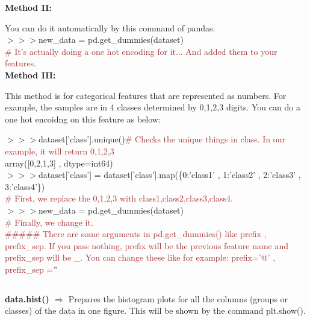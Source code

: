 \documentclass[a4paper,18pt]{article}
\begin{document}
\textbf{Method II:\\}

You can do it automatically by this command of pandas:\\

$>>>$new\_data = pd.get\_dummies(dataset)\\

{\textcolor{brown}{\# It's actually doing a one hot encoding for it... And added them to your features.}}\\

\textbf{Method III:\\}

This method is for categorical features that are represented as numbers. For example, the samples are in 4 classes determined by 0,1,2,3 digits. You can do a one hot encoidng on this feature as below:

$>>>$dataset['class'].unique(){\textcolor{brown}{\# Checks the unique things in class. In our example, it will return 0,1,2,3}}\\

\hspace*{14pt}array([0,2,1,3] , dtype=int64)\\

$>>>$dataset['class'] = dataset['class'].map(\{0:'class1' , 1:'class2' , 2:'class3' , 3:'class4'\})\\

{\textcolor{brown}{\# First, we replace the 0,1,2,3 with class1,class2,class3,class4.}}\\

$>>>$new\_data = pd.get\_dummies(dataset)\\

{\textcolor{brown}{\# Finally, we change it.}}\\


{\textcolor{brown}{\#\#\#\#\# There are some arguments in pd.get\_dummies() like prefix , prefix\_sep. If you pass nothing, prefix will be the previous feature name and prefix\_sep will be \_. You can change these like for example: prefix='@' , prefix\_sep ='\^' }}\\


\subsection{\colorbox {matgreen}{\color{white}{\large data.hist()}}}
\textbf{data.hist() $\Rightarrow$} Prepares the histogram plots for all the columns (groups or classes) of the data in one figure. This will be shown by the command plt.show().\\\\
\end{document}
